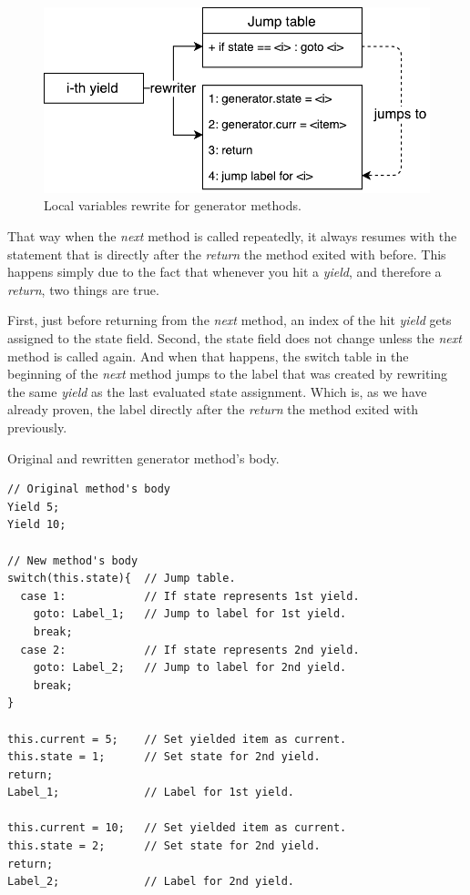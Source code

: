 \begin{figure}[h]
	\centering	
	\includegraphics[scale=0.75]{../img/4_1_position}	
	\caption{Local variables rewrite for generator methods.}
	\label{fig4.1:Position}
\end{figure}

That way when the \emph{next} method is called repeatedly, it always resumes with the statement that is directly after the \emph{return} the method exited with before. This happens simply due to the fact that whenever you hit a \emph{yield}, and therefore a \emph{return}, two things are true. 

First, just before returning from the \emph{next} method, an index of the hit \emph{yield} gets assigned to the state field. Second, the state field does not change unless the \emph{next} method is called again. And when that happens, the switch table in the beginning of the \emph{next} method jumps to the label that was created by rewriting the same \emph{yield} as the last evaluated state assignment. Which is, as we have already proven, the label directly after the \emph{return} the method exited with previously.

\begin{listing}[H]
\caption{Original and rewritten generator method's body.}
\label{list4.1:generatorRewrite}
\begin{verbatim}
// Original method's body
Yield 5;
Yield 10;

// New method's body
switch(this.state){  // Jump table.
  case 1:            // If state represents 1st yield.
    goto: Label_1;   // Jump to label for 1st yield.
    break;
  case 2:            // If state represents 2nd yield.
    goto: Label_2;   // Jump to label for 2nd yield.
    break;
}

this.current = 5;    // Set yielded item as current.
this.state = 1;      // Set state for 2nd yield.
return;
Label_1;             // Label for 1st yield.

this.current = 10;   // Set yielded item as current.
this.state = 2;      // Set state for 2nd yield.
return;
Label_2;             // Label for 2nd yield.
\end{verbatim}
\end{listing}

